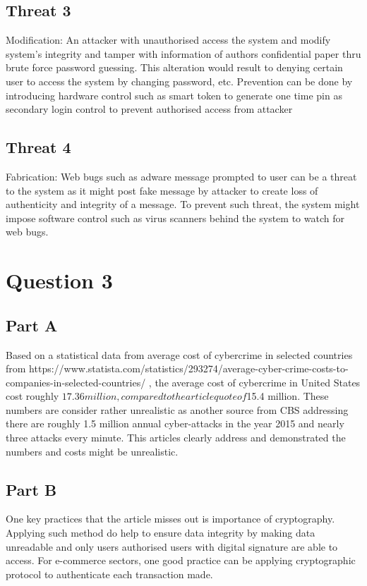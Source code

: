 \documentclass[12pt]{article}
\begin{document}
\subsection*{Threat 3}
Modification: An attacker with unauthorised access the system and modify system’s integrity and tamper with information of authors confidential paper thru brute force password guessing. This alteration would result to denying certain user to access the system by changing password, etc. Prevention can be done by introducing hardware control such as smart token to generate one time pin as secondary login control to prevent authorised access from attacker 

\subsection*{Threat 4}
Fabrication: Web bugs such as adware message prompted to user can be a threat to the system as it might post fake message by attacker to create loss of authenticity and integrity of a message. To prevent such threat, the system might impose software control such as virus scanners behind the system to watch for web bugs.

\section*{Question 3}
\subsection*{Part A}
Based on a statistical data from average cost of cybercrime in selected countries from https://www.statista.com/statistics/293274/average-cyber-crime-costs-to-companies-in-selected-countries/ , the average cost of cybercrime in United States cost roughly $17.36 million, compared to the article quote of $15.4 million. These numbers are consider rather unrealistic as another source from CBS addressing there are roughly 1.5 million annual cyber-attacks in the year 2015 and nearly three attacks every minute. This articles clearly address and demonstrated the numbers and costs might be unrealistic.

\subsection*{Part B}
One key practices that the article misses out is importance of cryptography. Applying such method do help to ensure data integrity by making data unreadable and only users authorised users with digital signature are able to access. For e-commerce sectors, one good practice can be applying cryptographic protocol to authenticate each transaction made. 
\end{document}
